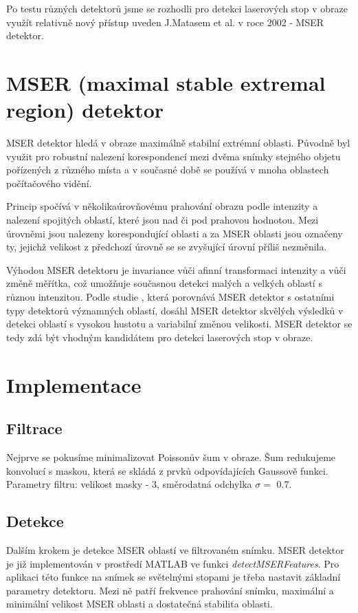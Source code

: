 Po testu různých detektorů jsme se rozhodli pro detekci laserových stop v obraze využít relativně nový přístup uveden J.Matasem et al. \cite{Matas} v roce 2002 - MSER detektor. 




\section{MSER (maximal stable extremal region) detektor}

MSER detektor hledá v obraze maximálně stabilní extrémní oblasti. Původně byl využit pro robustní nalezení korespondencí mezi dvěma snímky stejného objetu pořízených z různého místa a v současné době se používá v mnoha oblastech počítačového vidění.  

Princip spočívá v několikaúrovňovému prahování obrazu podle intenzity a nalezení spojitých oblastí, které jsou nad či pod prahovou hodnotou. Mezi úrovněmi jsou nalezeny korespondující oblasti a za MSER oblasti jsou označeny ty, jejichž velikost z předchozí úrovně se se zvyšující úrovní příliš nezměnila. 

Výhodou MSER detektoru je invariance vůči afinní transformaci intenzity a vůči změně měřítka, což umožňuje současnou detekci malých a velkých oblastí s různou intenzitou. Podle studie \cite{Comparison}, která porovnává MSER detektor s ostatními typy detektorů významných oblastí, dosáhl MSER detektor skvělých výsledků v detekci oblastí s vysokou hustotu a variabilní změnou velikosti. MSER detektor se tedy zdá být vhodným kandidátem pro detekci laserových stop v obraze.

\section{Implementace}

\subsection{Filtrace}
   Nejprve se pokusíme minimalizovat Poissonův šum v obraze. Šum redukujeme konvolucí s maskou, která se skládá z prvků odpovídajících Gaussově funkci. Parametry filtru: velikost masky - \SI{3}{\px}, směrodatná odchylka $\sigma = $ \SI{0.7}{\px}.

\subsection{Detekce} 
   Dalším krokem je detekce MSER oblastí ve filtrovaném snímku. MSER detektor je již implementován v prostředí MATLAB ve funkci \textit{detectMSERFeatures}. Pro aplikaci této funkce na snímek se světelnými stopami je třeba nastavit základní parametry detektoru. Mezi ně patří frekvence prahování snímku, maximální a minimální velikost MSER oblasti a dostatečná stabilita oblasti. 
   
